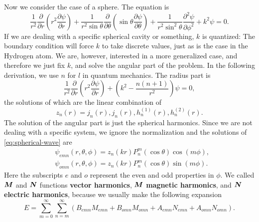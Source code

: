 \documentclass[hyperref, a4paper]{article}
\newcommand*{\concept}[1]{{\textbf{#1}}}
\begin{document}
Now we consider the case of a sphere. The equation is 
\begin{equation}
    \frac{1}{r^{2}} \frac{\partial}{\partial r}\left(r^{2} \frac{\partial \psi}{\partial r}\right)+\frac{1}{r^{2} \sin \theta} \frac{\partial}{\partial \theta}\left(\sin \theta \frac{\partial \psi}{\partial \theta}\right)+\frac{1}{r^{2} \sin ^{2} \theta} \frac{\partial^{2} \psi}{\partial \phi^{2}}+k^{2} \psi=0.
    \label{eq:spherical-wave}
\end{equation}
If we are dealing with a specific spherical cavity or something, $k$ is quantized: The boundary condition 
will force $k$ to take discrete values, just as is the case in the Hydrogen atom. We are, however, interested 
in a more generalized case, and therefore we just fix $k$, and solve the angular part of the problem.
In the following derivation, we use $n$ for $l$ in quantum mechanics. The radius part is 
\begin{equation}
    \frac{1}{r^{2}} \frac{\partial}{\partial r}\left(r^{2} \frac{\partial \psi}{\partial r}\right) + \left( k^2 - \frac{n(n+1)}{r^2} \right) \psi = 0,
\end{equation}
the solutions of which are the linear combination of 
\begin{equation}
    z_n(r) = j_n(r), j_n(r), h^{(1)}_n(r), h^{(2)}_n(r).
\end{equation}
The solution of the angular part is just the spherical harmonics. Since we are not dealing with a 
specific system, we ignore the normalization and the solutions of \eqref{eq:spherical-wave} are 
\begin{equation}
    \begin{aligned}
        &\psi_{e m n}(r, \theta, \phi)=z_{n}(k r) P_{n}^{m}(\cos \theta) \cos (m \phi), \\
        &\psi_{o m n}(r, \theta, \phi)=z_{n}(k r) P_{n}^{m}(\cos \theta) \sin (m \phi).
        \end{aligned}
\end{equation}
Here the subscripts $e$ and $o$ represent the even and odd properties in $\phi$.
We called $\vb*{M}$ and $\vb*{N}$ functions \concept{vector harmonics}, $\vb*{M}$ \concept{magnetic harmonics}, 
and $\vb*{N}$ \concept{electric harmonics}, because we usually make the following expansion
\begin{equation}
    E=\sum_{m=0}^{\infty} \sum_{n=m}^{\infty}\left(B_{e m n} M_{e m n}+B_{o m n} M_{o m n}+A_{e m n} N_{e m n}+A_{o m n} N_{o m n}\right).
\end{equation}
\end{document}
